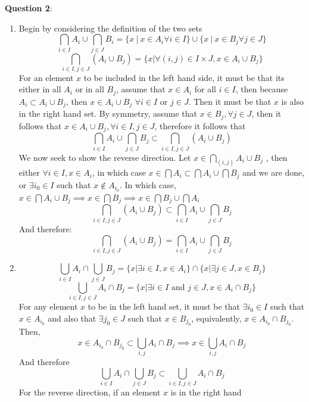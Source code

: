 \documentclass{article} %
\newcommand{\question}[2][]{
  \begin{flushleft}
    \textbf{Question #1}: \textit{#2}

\end{flushleft}}
\begin{document}
\question[2]{}
\begin{enumerate}
  \item Begin by considering the definition of the two sets
    $$
    \bigcap_{i \in I} A_i \cup \bigcap_{j\in J} B_i = \{x~|~x \in A_i
    \forall i \in I\} \cup \{x~|~x \in B_j \forall j \in J\}
    $$
    \[
      \bigcap_{i\in I, j\in J} (A_i \cup B_j) = \{x | \forall (i, j)
      \in I \times J, x \in A_i \cup B_j\}
    \]
    For an element $x$ to be included in the left hand side, it must be
    that its either in all $A_i$ or in all $B_j$, assume that $x \in
    A_i$ for all $i \in I$, then because $A_i  \subset A_i \cup B_j$,
    then  $x \in A_i \cup B_j$ $\forall i \in I$ or $j \in J$. Then
    it must be that $x$ is also in the right hand set. By symmetry,
    assume that $x\in B_j, \forall j \in J$, then it follows that $x
    \in A_i \cup B_j, \forall i \in I, j \in J$, therefore it follows that
    $$
    \bigcap_{i \in I} A_i \cup \bigcap_{j \in J} B_j \subset
    \bigcap_{i\in I, j\in J}
    (A_i \cup B_j)
    $$
    We now seek to show the reverse direction. Let $x \in
    \bigcap_{(i,j)} A_i \cup B_j$ , then either $\forall i
    \in I, x \in A_i$, in which case $x \in \bigcap A_i \subset
    \bigcap A_i \cup \bigcap B_j$ and we are done, or $\exists i_0
    \in I$ such that $x \notin A_{i_0}$. In which case, $x \in
    \bigcap A_i \cup B_j \implies x \in \bigcap B_j \implies x \in
    \bigcap B_j \cup \bigcap A_i$
    $$
    \bigcap_{i\in I, j\in J}
    (A_i \cup B_j)
    \subset
    \bigcap_{i \in I} A_i \cup \bigcap_{j \in J} B_j
    $$
    And therefore:
    $$
    \bigcap_{i\in I, j\in J}
    (A_i \cup B_j)
    =
    \bigcap_{i \in I} A_i \cup \bigcap_{j \in J} B_j
    $$
  \item
    \[
      \bigcup_{i \in I} A_i \cap \bigcup_{j \in J} B_j = \{x |
      \exists i \in I, x \in A_i \} \cap \{x | \exists j \in J, x \in B_j \}
    \]
    \[
      \bigcup_{i \in I,j \in J} A_i \cap B_j = \{ x| \exists i \in I
      \text{ and } j \in J, x \in A_i \cap B_j \}
    \]
    For any element $x$ to be in the left hand set, it must be that
    $\exists i_0 \in I$ such that $x \in A_{i_0}$ and also that $\exists j_0
    \in J$ such that $x \in B_{j_0}$, equivalently, $x \in A_{i_0}
    \cap B_{j_0}$. Then, $$x \in A_{i_0} \cap B_{j_0} \subset
    \bigcup_{i,j} A_i \cap B_j  \implies x \in \bigcup_{i,j} A_i \cap B_j$$
    And therefore
    \[\bigcup_{i \in I} A_i \cap \bigcup_{j \in J} B_j  \subset
      \bigcup_{i \in I,j \in J} A_i \cap B_j
    \]
    For the reverse direction, if an element $x$ is in the right hand

\end{enumerate}
\end{document}
